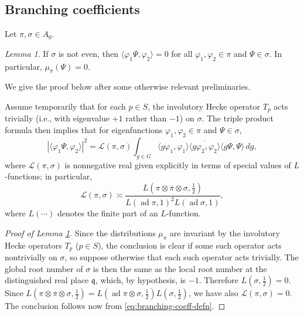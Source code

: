 \documentclass[reqno,10pt]{amsart}
\theoremstyle{plain} %
\theoremstyle{definition}
\theoremstyle{plain} %
\theoremstyle{remark}
\theoremstyle{itplain} %
\newtheorem{lemma}{Lemma}
\theoremstyle{remark} %
\numberwithin{equation}{section}
\DeclareMathOperator{\ad}{ad}
\begin{document}
\subsection{Branching coefficients}\label{sec:branch-coeff}
Let $\pi, \sigma \in A_0$.
\begin{lemma}\label{lem:trivial-vanishing}
  If $\sigma$ is not even, then $\langle \varphi_1 \Psi, \varphi_2 \rangle = 0$ for all $\varphi_1, \varphi_2 \in \pi$ and $\Psi \in \sigma$.  In particular, $\mu_\pi(\Psi) = 0$.
\end{lemma}
We give the proof below after some otherwise relevant preliminaries.

Assume temporarily that for each $p \in S$, the involutory Hecke operator $T_{p}$ acts trivially (i.e., with eigenvalue $+1$ rather than $-1$) on $\sigma$.  The triple product formula \cite{MR2449948} then implies that for eigenfunctions $\varphi_1, \varphi_2 \in \pi$ and $\Psi \in \sigma$,
\begin{equation}\label{eq:branching-coeff-defn}
  |\langle \varphi_1 \Psi, \varphi_2  \rangle|^2
  =
  \mathcal{L}(\pi,\sigma)
  \int_{g \in G}
  \langle g \varphi_1, \varphi_1 \rangle
  \overline{\langle g \varphi_2, \varphi_2 \rangle}
  \langle g \Psi, \Psi  \rangle \, d g,
\end{equation}
where $\mathcal{L}(\pi,\sigma)$ is nonnegative real given explicitly in terms of special values of $L$-functions; in particular,
\begin{equation}\label{eq:defn-cal-L}
  \mathcal{L}(\pi,\sigma)
  \asymp
  \frac{L(\pi \otimes \overline{\pi } \otimes \sigma,
    \tfrac{1}{2})}{
    L(\ad \pi,1)^2 L(\ad \sigma,1)},
\end{equation}
where $L(\dotsb)$ denotes the finite part of an $L$-function.

\begin{proof}[Proof of Lemma \ref{lem:trivial-vanishing}]
  Since the distributions $\mu_\pi$ are invariant by the involutory Hecke operators $T_p$ ($p \in S$), the conclusion is clear if some such operator acts nontrivially on $\sigma$, so suppose otherwise that each such operator acts trivially.  The global root number of $\sigma$ is then the same as the local root number at the distinguished real place $\mathfrak{q}$, which, by hypothesis, is $-1$.  Therefore $L(\sigma, \tfrac{1}{2} ) = 0$.  Since $L(\pi \otimes \overline{\pi } \otimes \sigma, \tfrac{1}{2} ) = L(\ad \pi \otimes \sigma, \tfrac{1}{2} ) L(\sigma, \tfrac{1}{2} )$, we have also $\mathcal{L}(\pi,\sigma) = 0$.  The conclusion follows now from \eqref{eq:branching-coeff-defn}.
\end{proof}
\end{document}
